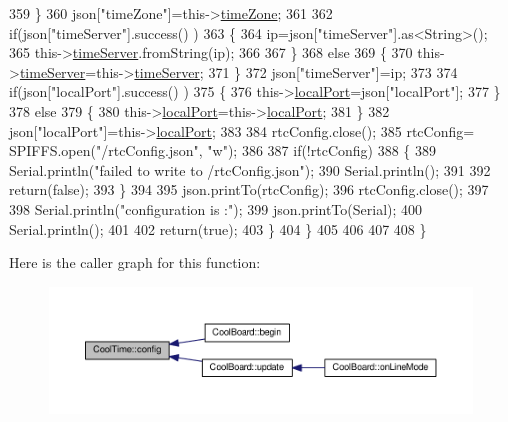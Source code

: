 \begin{DoxyCode}
359             \}
360             json[\textcolor{stringliteral}{"timeZone"}]=this->\hyperlink{classCoolTime_a1916d98810c2a4e9ba72867e8c1b9a99}{timeZone};
361             
362             \textcolor{keywordflow}{if}(json[\textcolor{stringliteral}{"timeServer"}].success() )
363             \{           
364                  ip=json[\textcolor{stringliteral}{"timeServer"}].as<String>();
365                 this->\hyperlink{classCoolTime_ad2b9858f399108cb440dd1e908916f04}{timeServer}.fromString(ip);
366                 
367             \}
368             \textcolor{keywordflow}{else}
369             \{
370                 this->\hyperlink{classCoolTime_ad2b9858f399108cb440dd1e908916f04}{timeServer}=this->\hyperlink{classCoolTime_ad2b9858f399108cb440dd1e908916f04}{timeServer};
371             \}
372             json[\textcolor{stringliteral}{"timeServer"}]=ip;
373             
374             \textcolor{keywordflow}{if}(json[\textcolor{stringliteral}{"localPort"}].success() )
375             \{                       
376                 this->\hyperlink{classCoolTime_a2f777da44d7ba678be8185299e9b49d1}{localPort}=json[\textcolor{stringliteral}{"localPort"}];
377             \}
378             \textcolor{keywordflow}{else}
379             \{
380                 this->\hyperlink{classCoolTime_a2f777da44d7ba678be8185299e9b49d1}{localPort}=this->\hyperlink{classCoolTime_a2f777da44d7ba678be8185299e9b49d1}{localPort};
381             \}
382             json[\textcolor{stringliteral}{"localPort"}]=this->\hyperlink{classCoolTime_a2f777da44d7ba678be8185299e9b49d1}{localPort};
383 
384             rtcConfig.close();
385             rtcConfig= SPIFFS.open(\textcolor{stringliteral}{"/rtcConfig.json"}, \textcolor{stringliteral}{"w"});
386             
387             \textcolor{keywordflow}{if}(!rtcConfig)
388             \{
389                 Serial.println(\textcolor{stringliteral}{"failed to write to /rtcConfig.json"});
390                 Serial.println();
391 
392                 \textcolor{keywordflow}{return}(\textcolor{keyword}{false});
393             \}
394             
395             json.printTo(rtcConfig);
396             rtcConfig.close();
397 
398             Serial.println(\textcolor{stringliteral}{"configuration is :"});
399             json.printTo(Serial);
400             Serial.println();
401         
402             \textcolor{keywordflow}{return}(\textcolor{keyword}{true}); 
403         \}
404     \}   
405 
406 
407 
408 \}
\end{DoxyCode}
Here is the caller graph for this function\+:
\nopagebreak
\begin{figure}[H]
\begin{center}
\leavevmode
\includegraphics[width=350pt]{classCoolTime_a87c28260c1bc77091162cbcf1ee2e129_icgraph}
\end{center}
\end{figure}
